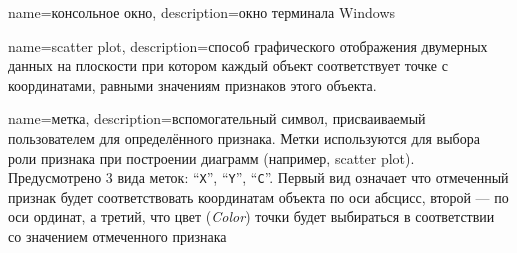 {
	name=консольное окно,
	description={окно терминала Windows}
}

{
	name=scatter plot,
	description={способ графического отображения двумерных данных на плоскости при котором каждый объект соответствует точке с координатами, равными значениям признаков этого объекта.}
}

{
	name=метка,
	description={вспомогательный символ, присваиваемый пользователем для  определённого признака. Метки используются для выбора роли признака при построении диаграмм (например, scatter plot). Предусмотрено 3 вида меток: ``\texttt{X}'', ``\texttt{Y}'', ``\texttt{C}''. Первый вид означает что отмеченный признак будет соответствовать координатам объекта по оси абсцисс, второй --- по оси ординат, а третий, что цвет (\textit{Color}) точки будет выбираться в соответствии со значением отмеченного признака}
}




